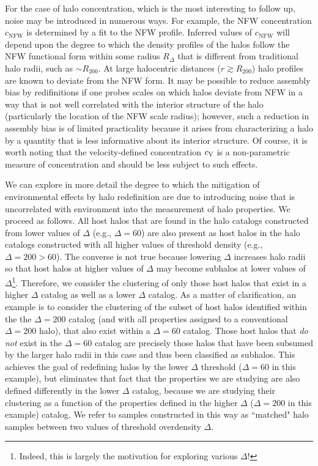 \documentclass[usenatbib,fleqn]{mnras}
\begin{document}
For the case of halo concentration, which is the most interesting to 
follow up, noise may be introduced in numerous ways. For example, 
the NFW concentration $c_{\mathrm{NFW}}$ is determined by a fit to the 
NFW profile. Inferred values of $c_{\mathrm{NFW}}$ will depend upon 
the degree to which the density profiles of the halos follow the NFW 
functional form within some radius $R_{\Delta}$ that is different from 
traditional halo radii, such as $\sim R_{200}$. At large halocentric 
distances ($r \gtrsim R_{200}$) halo profiles are known to deviate 
from the NFW form. It may be possible to reduce assembly bias by redifinitions if one probes scales on which halos deviate from NFW in a way that is not well correlated with the interior structure of the halo (particularly the location of the NFW scale radius); however, such a reduction in assembly bias is of limited practicality because it arises from characterizing a halo by a quantity that is less informative about its interior structure. Of course, it is worth noting that the velocity-defined concentration $c_{\rm V}$ is a non-parametric measure of concentration and should be less subject to such effects. 

We can explore in more detail the degree to which the mitigation of environmental effects by halo redefinition are due to introducing noise 
that is uncorrelated with environment into the measurement of halo properties. We proceed as follows. All host halos that are found in the halo catalogs constructed from lower values of $\Delta$ (e.g., $\Delta=60$) are also present as host halos in the halo catalogs constructed with all higher values of threshold density (e.g., $\Delta=200>60$). The converse is not true because lowering $\Delta$ increases halo radii so that host halos at higher values of $\Delta$ may become subhalos at lower values of $\Delta$\footnote{Indeed, this is largely the motivation for exploring various $\Delta$!}. Therefore, we consider the clustering of only those host halos that exist in a higher $\Delta$ catalog as well as a lower $\Delta$ catalog. As a matter of clarification, an example is to consider the clustering of the subset of host halos identified within the the $\Delta=200$ catalog (and with all properties assigned to a conventional $\Delta=200$ halo), that also exist within a $\Delta=60$ catalog. Those host halos that {\em do not} exist in the $\Delta=60$ catalog are precisely those halos that have been subsumed by the larger halo radii in this case and thus been classified as subhalos. This achieves the goal of redefining halos by the lower $\Delta$ threshold ($\Delta=60$ in this example), but eliminates that fact that the properties we are studying are also defined differently in the lower $\Delta$ catalog, because we are studying their clustering as a function of the properties defined in the higher $\Delta$ ($\Delta=200$ in this example) catalog. We refer to samples constructed in this way as ``matched" halo samples between two values of threshold overdensity $\Delta$. 
\end{document}
